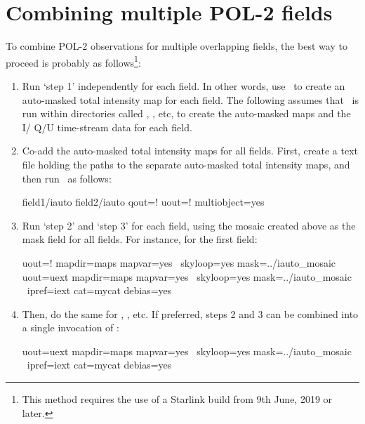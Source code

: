 \section{Combining multiple POL-2 fields}

To combine POL-2 observations for multiple overlapping fields, the best way to proceed is probably as follows\footnote{This method requires the use of a Starlink build from 9th June, 2019 or later.}:

\begin{enumerate}
\item Run `step 1' independently for each field. In other words, use \poltwomap\ to create an 
auto-masked total intensity map for each field. The following assumes that \poltwomap\ is run 
within directories called , , etc, to create the auto-masked maps and the I/
Q/U time-stream data for each field.

\item Co-add the auto-masked total intensity maps for all fields. First, create a text file holding 
the paths to the separate auto-masked total intensity maps, and then run \poltwomap\ as 
follows:

\begin{terminalv}
        field1/iauto
        field2/iauto
                  qout=! uout=! multiobject=yes
\end{terminalv}

\item Run `step 2' and `step 3' for each field, using the mosaic created above as the mask field 
for all fields. For instance, for the first field:

\begin{terminalv}
                  uout=! mapdir=maps mapvar=yes \
                  skyloop=yes mask=../iauto_mosaic 
                  uout=uext mapdir=maps mapvar=yes \
                  skyloop=yes mask=../iauto_mosaic \
                  ipref=iext cat=mycat debias=yes
\end{terminalv}

\item Then, do the same for \file{field2}, , etc. If preferred, steps 2 and 3 can be 
combined into a single invocation of \poltwomap:

\begin{terminalv}
                  uout=uext mapdir=maps mapvar=yes \
                  skyloop=yes mask=../iauto_mosaic \
                  ipref=iext cat=mycat debias=yes
\end{terminalv}


\end{enumerate}
